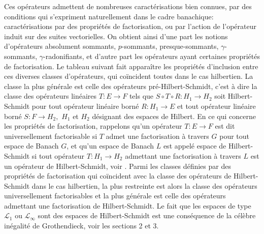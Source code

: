 \documentclass{smfart}
\theoremstyle{plain}
\theoremstyle{definition}
\begin{document}
 
Ces opérateurs admettent de nombreuses caractérisations bien
connues, par des conditions qui s'expriment naturellement dans le
cadre banachique: caractérisations par des propriétés de
factorisation, ou par l'action de l'opérateur induit sur des suites
vectorielles. On obtient ainsi d'une part les notions d'opérateurs
absolument sommants, $p$-sommants, presque-sommants,
$\gamma$-sommants, $\gamma$-radonifiants, et d'autre part les
opérateurs ayant certaines propriétés de factorisation.  Le tableau
suivant fait apparaître les propriétés d'inclusion
entre ces diverses classes d'opérateurs, qui coïncident
toutes dans le cas hilbertien. La classe la plus générale est
celle des opérateurs pré-Hilbert-Schmidt, c'est à dire la classe
des opérateurs linéaires $T:E \to F$ tels que $S\circ T\circ R:
H_1 \to H_2$ soit Hilbert-Schmidt pour tout opérateur linéaire
borné $R: H_1\to E$ et tout opérateur linéaire borné $S:F\to
H_2,$ $H_1$ et $H_2$ désignant des espaces de Hilbert.  En ce qui
concerne les propriétés de factorisation, rappelons qu'un
opérateur $T:E \to F$ est dit universellement factorisable si $T$
admet une factorisation à travers $G$ pour tout espace de Banach
$G$, et qu'un espace de Banach $L$ est appelé espace de
Hilbert-Schmidt si tout opérateur $T: H_1 \to H_2$ admettant une
factorisation à travers $L$ est un opérateur de Hilbert-Schmidt,
voir \cite{DJT}. Parmi les classes définies par des propriétés
de factorisation qui coïncident avec la classe des
opérateurs de Hilbert-Schmidt dans le cas hilbertien, la plus
restreinte est alors la classe des opérateurs universellement
factorisables et la plus générale est celle des opérateurs
admettant une factorisation de Hilbert-Schmidt. Le fait que les
espaces de type ${\mathcal L}_1$ ou ${\mathcal L}_{\infty}$ sont des
espaces de Hilbert-Schmidt est une conséquence de la célèbre
inégalité de Grothendieck, voir les sections 2 et 3.
\end{document}
